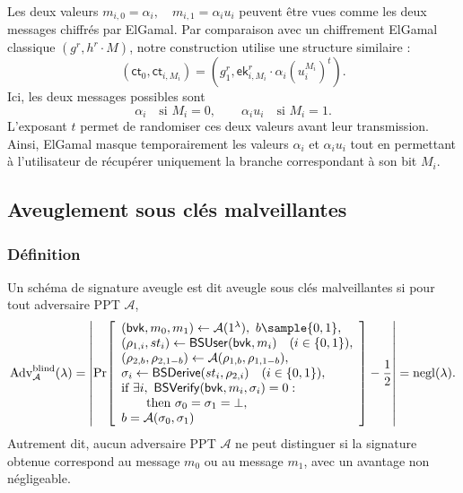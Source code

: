 Les deux valeurs $m_{i,0}=\alpha_i, \quad m_{i,1}=\alpha_i u_i$
peuvent être vues comme les deux messages chiffrés par ElGamal.
Par comparaison avec un chiffrement ElGamal classique
$(g^r,h^r\cdot M)$,
notre construction utilise une structure similaire :
\[
(\mathsf{ct}_0,\mathsf{ct}_{i,M_i})
=
(g_1^r,\mathsf{ek}_{i,M_i}^{r}\cdot\alpha_i (u_i^{M_i})^t).
\]
Ici, les deux messages possibles sont
\[
\alpha_i \quad \text{si } M_i=0,
\qquad
\alpha_i u_i \quad \text{si } M_i=1.
\]
L'exposant $t$ permet de randomiser ces deux valeurs avant leur transmission.
Ainsi, ElGamal masque temporairement les valeurs
$\alpha_i$ et $\alpha_i u_i$ tout en permettant à l'utilisateur de récupérer
uniquement la branche correspondant à son bit $M_i$.



\subsection{Aveuglement sous clés malveillantes}

\subsubsection{Définition}

\begin{definition}[Blindness]
Un schéma de signature aveugle est dit aveugle sous clés malveillantes si pour tout adversaire PPT
$\mathcal A$,
\[
\operatorname{Adv}^{\mathrm{blind}}_{\mathcal A}(\lambda)
=
\left|
\Pr\!\left[
\begin{array}{l}
(\mathsf{bvk},m_0,m_1)\gets\mathcal A(1^\lambda),\
b\sample\{0,1\},\\
(\rho_{1,i},st_i)\gets\mathsf{BSUser}(\mathsf{bvk},m_i)
\quad(i\in\{0,1\}),\\
(\rho_{2,b},\rho_{2,1-b})\gets
\mathcal A(\rho_{1,b},\rho_{1,1-b}),\\
\sigma_i\gets
\mathsf{BSDerive}(st_i,\rho_{2,i})
\quad(i\in\{0,1\}),\\
\text{if }\exists i,\
\mathsf{BSVerify}(\mathsf{bvk},m_i,\sigma_i)=0:\\
\qquad\text{then }\sigma_0=\sigma_1=\bot,\\
b=\mathcal A(\sigma_0,\sigma_1)
\end{array}
\right]
-\frac12
\right|
= \operatorname{negl}(\lambda).
\]
Autrement dit, aucun adversaire PPT $\mathcal A$ ne peut distinguer si la signature obtenue correspond au message $m_0$ ou au message $m_1$, avec un avantage non négligeable.
\end{definition}

